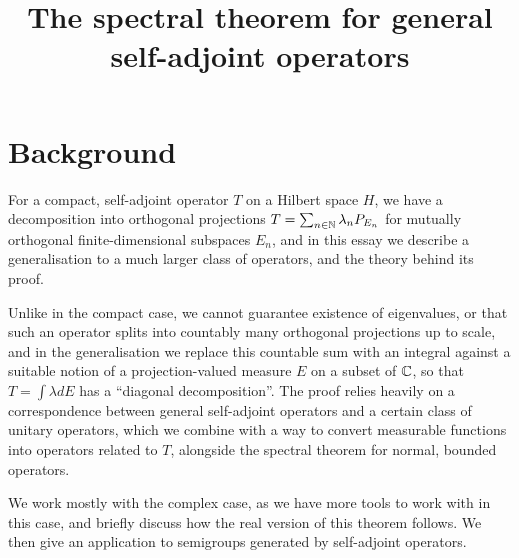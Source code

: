 \documentclass[10pt]{amsart}
\title{The spectral theorem for general self-adjoint operators}
\begin{document}
\maketitle
\section{Background}


For a compact, self-adjoint operator $T$ on a Hilbert space $H$, we have a decomposition into orthogonal projections $T = \sum_{n \in \mathbb{N}}\lambda_n P_{E_n}$ for mutually orthogonal finite-dimensional subspaces $E_n$, and in this essay we describe a generalisation to a much larger class of operators, and the theory behind its proof. 

Unlike in the compact case, we cannot guarantee existence of eigenvalues, or that such an operator splits into countably many orthogonal projections up to scale, and in the generalisation we replace this countable sum with an integral against a suitable notion of a projection-valued measure $E$ on a subset of $\mathbb{C}$, so that $T = \int \lambda dE$ has a ``diagonal decomposition''. The proof relies heavily on a correspondence between general self-adjoint operators and a certain class of unitary operators, which we combine with a way to convert measurable functions into operators related to $T$, alongside the spectral theorem for normal, bounded operators.

We work mostly with the complex case, as we have more tools to work with in this case, and briefly discuss how the real version of this theorem follows. We then give an application to semigroups generated by self-adjoint operators.


\end{document}
